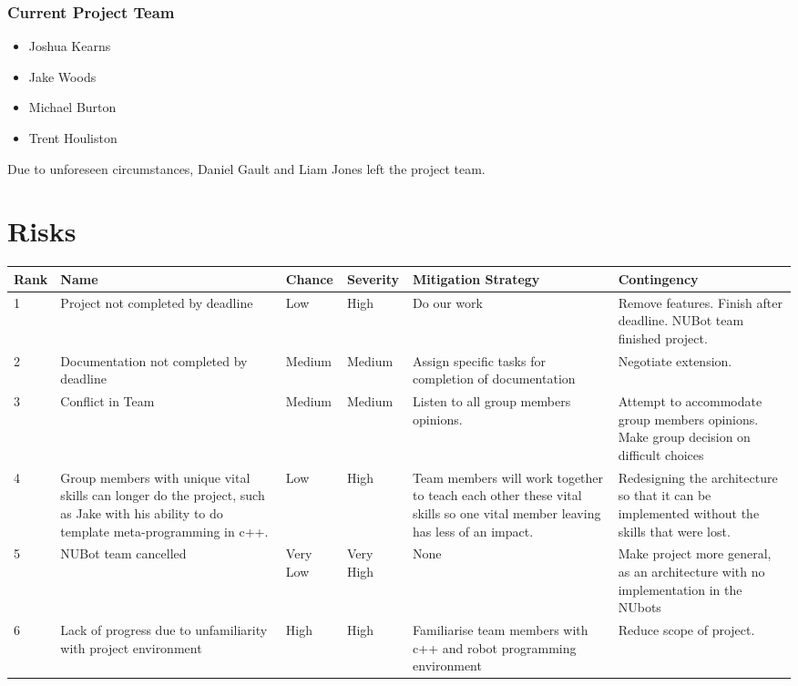 \documentclass[english,12pt]{scrartcl}
\begin{document}
			\subsubsection{Current Project Team}
				\begin{itemize}
					\item Joshua Kearns
					\item Jake Woods
					\item Michael Burton
					\item Trent Houliston
				\end{itemize}
				Due to unforeseen circumstances, Daniel Gault and Liam Jones left the project team.

\newpage
	\section{Risks}
		\begin{table}[htbp]
		\begin{tabularx}{\linewidth}{ | m{0.6cm} |  X | m{1.05cm} |  m{1.05cm} |  X | X |}
			\hline 
			Rank & Name & Chance & Severity & Mitigation Strategy & Contingency \\  \hline
			1 & Project not completed by deadline & Low & High & Do our work & Remove features. Finish after deadline. NUBot team finished project. \\ \hline
			2 & Documentation not completed by deadline & Medium & Medium & Assign specific tasks for completion of documentation & Negotiate extension. \\ \hline
			3 & Conflict in Team & Medium & Medium & Listen to all group members opinions. & Attempt to accommodate group members opinions. Make group decision on difficult choices \\ \hline
			4 & Group members with unique vital skills can longer do the project, such as Jake with his ability to do template meta-programming in c++. & Low & High & Team members will work together to teach each other these vital skills so one vital member leaving has less of an impact. & Redesigning the architecture so that it can be implemented without the skills that were lost. \\ \hline
			5 & NUBot team cancelled & Very Low & Very High & None & Make project more general, as an architecture with no implementation in the NUbots \\ \hline
			6 & Lack of progress due to unfamiliarity with project environment & High & High & Familiarise team members with c++ and robot programming environment & Reduce scope of project. \\ \hline
		\end{tabularx}
		\end{table}
\end{document}
